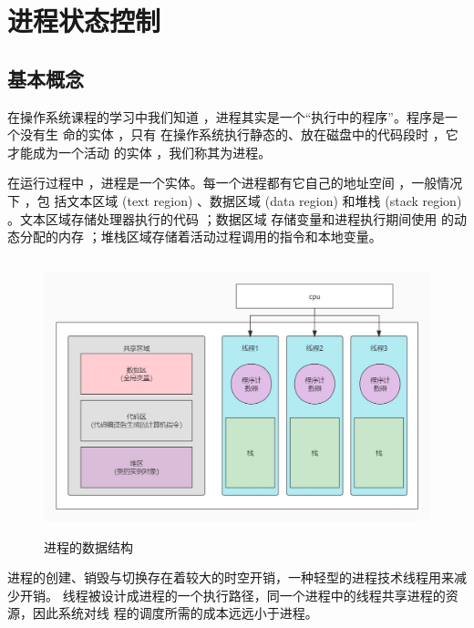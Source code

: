\section{进程状态控制}

\subsection{基本概念}

在操作系统课程的学习中我们知道 ，进程其实是一个“执行中的程序”。程序是一个没有生
命的实体 ，只有 在操作系统执行静态的、放在磁盘中的代码段时 ，它才能成为一个活动
的实体 ，我们称其为进程。

在运行过程中 ，进程是一个实体。每一个进程都有它自己的地址空间 ，一般情况下 ，包
括文本区域  (text  region)  、数据区域  (data region)  和堆栈  (stack
 region)  。文本区域存储处理器执行的代码 ；数据区域 存储变量和进程执行期间使用
的动态分配的内存 ；堆栈区域存储着活动过程调用的指令和本地变量。
\begin{figure}[H]
	\centering
	\includegraphics[width=14cm,height=8cm]{figures/05-02-01-进程的数据结构.png}
	\caption{进程的数据结构}
\end{figure}  

进程的创建、销毁与切换存在着较大的时空开销，一种轻型的进程技术线程用来减少开销。
线程被设计成进程的一个执行路径，同一个进程中的线程共享进程的资源，因此系统对线
程的调度所需的成本远远小于进程。

